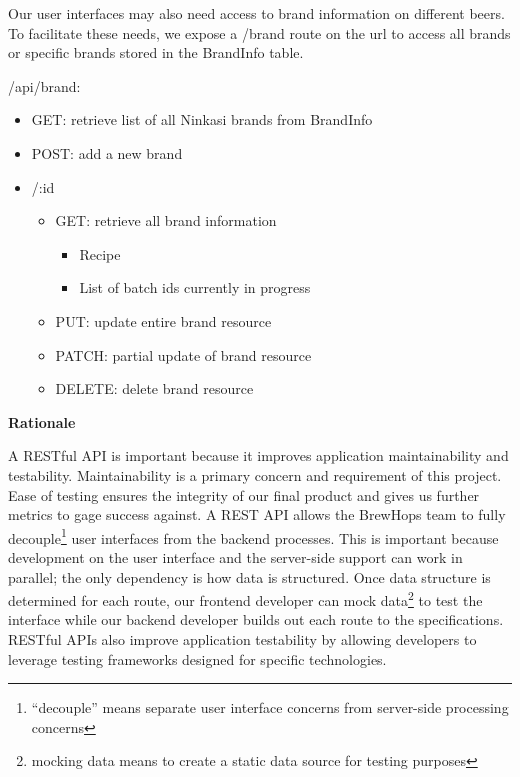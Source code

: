 \documentclass[draftclsnofoot,onecolumn,letterpaper,10pt]{IEEEtran}
\begin{document}
			Our user interfaces may also need access to brand information on different beers. To facilitate these needs, we expose a /brand route on the url to access all brands or specific brands stored in the BrandInfo table.

			/api/brand:
			\begin{itemize}
				\item GET: retrieve list of all Ninkasi brands from BrandInfo
				\item POST: add a new brand

				\item /:id
				\begin{itemize}
					\item GET: retrieve all brand information
					\begin{itemize}
						\item Recipe
						\item List of batch ids currently in progress
					\end{itemize}
					\item PUT: update entire brand resource
					\item PATCH: partial update of brand resource
					\item DELETE: delete brand resource
				\end{itemize}
			\end{itemize}



			\textbf{Rationale}

			A RESTful API is important because it improves application maintainability and testability. Maintainability is a primary concern and requirement of this project. Ease of testing ensures the integrity of our final product and gives us further metrics to gage success against.
			A REST API allows the BrewHops team to fully decouple\footnote{“decouple” means separate user interface concerns from server-side processing concerns} user interfaces from the backend processes. This is important because development on the user interface and the server-side support can work in parallel; the only dependency is how data is structured. Once data structure is determined for each route, our frontend developer can mock data\footnote{mocking data means to create a static data source for testing purposes} to test the interface while our backend developer builds out each route to the specifications. RESTful APIs also improve application testability by allowing developers to leverage testing frameworks designed for specific technologies.
\end{document}
